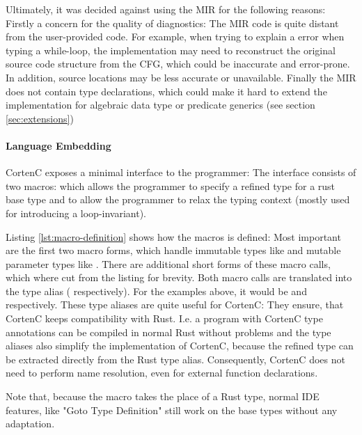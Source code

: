 \documentclass[twoside, english]{sdqthesis}
\theoremstyle{definition}
\begin{document}
Ultimately, it was decided against using the MIR for the following reasons:
Firstly a concern for the quality of diagnostics: The MIR code is quite distant from the user-provided code. For example, when trying to explain a error when typing a while-loop, the implementation may need to reconstruct the original source code structure from the CFG, which could be inaccurate and error-prone. 
In addition, source locations may be less accurate or unavailable. 
Finally the MIR does not contain type declarations, which could make it hard to extend the implementation for algebraic data type or predicate generics (see section \ref{sec:extensions})

\paragraph{Language Embedding}
CortenC exposes a minimal interface to the programmer: The interface consists of two macros:
 which allows the programmer to specify a refined type for a rust base type and
 to allow the programmer to relax the typing context (mostly used for introducing a loop-invariant). 

Listing \ref{lst:macro-definition} shows how the  macros is defined: Most important are the first two macro forms, which handle immutable types like  and mutable parameter types like . 
There are additional short forms of these macro calls, which where cut from the listing for brevity. Both macro calls are translated into the type alias  ( respectively). For the examples above, it would be  and  respectively. These type aliases are quite useful for CortenC: They ensure, that CortenC keeps compatibility with Rust. I.e. a program with CortenC type annotations can be compiled in normal Rust without problems and the type aliases also simplify the implementation of CortenC, because the refined type can be extracted directly from the Rust type alias. Consequently, CortenC does not need to perform name resolution, even for external function declarations.

Note that, because the  macro takes the place of a Rust type, normal IDE features, like "Goto Type Definition" still work on the base types without any adaptation.
\end{document}
